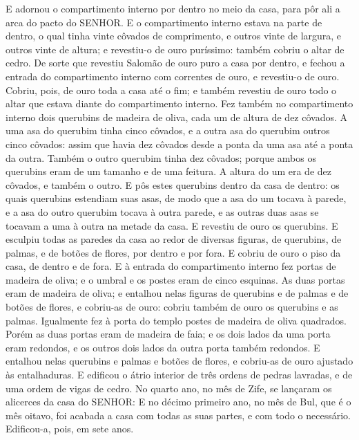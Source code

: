 {  E adornou o compartimento interno por dentro no meio da casa, para pôr ali a arca do pacto do SENHOR. %
  E o compartimento interno estava na parte de dentro, o qual tinha vinte côvados de comprimento, e outros vinte de largura, e outros vinte de altura; e revestiu-o de ouro puríssimo: também cobriu o altar de cedro.
  De sorte que revestiu Salomão de ouro puro a casa por dentro, e fechou a entrada do compartimento interno com correntes de ouro, e revestiu-o de ouro. %
  Cobriu, pois, de ouro toda a casa até o fim; e também revestiu de ouro todo o altar que estava diante do compartimento interno.
  Fez também no compartimento interno dois querubins de madeira de oliva, cada um de altura de dez côvados.
  A uma asa do querubim tinha cinco côvados, e a outra asa do querubim outros cinco côvados: assim que havia dez côvados desde a ponta da uma asa até a ponta da outra.
  Também o outro querubim tinha dez côvados; porque ambos os querubins eram de um tamanho e de uma feitura.
  A altura do um era de dez côvados, e também {}o outro.
  E pôs estes querubins dentro da casa de dentro: os quais querubins estendiam suas asas, de modo que a asa do um tocava à parede, e a asa do outro querubim tocava à outra parede, e as outras duas asas se tocavam a uma à outra na metade da casa.
  E revestiu de ouro os querubins.
  E esculpiu todas as paredes da casa ao redor de diversas figuras, de querubins, de palmas, e de botões de flores, por dentro e por fora. %
  E cobriu de ouro o piso da casa, de dentro e de fora.
  E à entrada do compartimento interno fez portas de madeira de oliva; e o umbral e os postes eram de cinco esquinas.
  As duas portas eram de madeira de oliva; e entalhou nelas figuras de querubins e de palmas e de botões de flores, e cobriu-as de ouro: cobriu também de ouro os querubins e as palmas.
  Igualmente fez à porta do templo postes de madeira de oliva quadrados.
  Porém as duas portas eram de madeira de faia; e os dois lados da uma porta eram redondos, e os outros dois lados da outra porta também redondos.
  E entalhou nelas querubins e palmas e botões de flores, e cobriu-as de ouro ajustado às entalhaduras.
  E edificou o átrio interior de três ordens de pedras lavradas, e de uma ordem de vigas de cedro.
  No quarto ano, no mês de Zife, se lançaram os alicerces da casa do SENHOR:
  E no décimo primeiro ano, no mês de Bul, que é o mês oitavo, foi acabada a casa com todas as suas partes, e com todo o necessário. Edificou-a, pois, em sete anos. %
\par }

